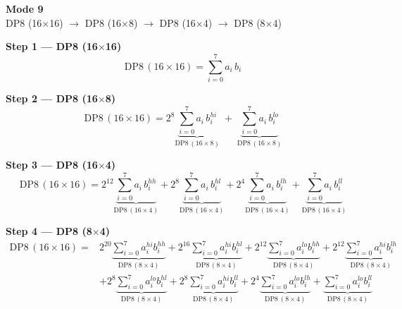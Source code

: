 \documentclass[fleqn]{article}
\newcommand{\DPop}[3]{\mathrm{DP#1}\,(#2\!\times\!#3)}
\begin{document}
\begin{center}
{\LARGE \textbf{Mode 9}}\\[4pt]
{\large DP8 (16$\times$16) $\rightarrow$ DP8 (16$\times$8) $\rightarrow$ DP8 (16$\times$4) $\rightarrow$ DP8 (8$\times$4)}
\end{center}

\vspace{4em}

\noindent\textbf{Step 1 --- DP8 (16$\times$16)}
\[
\DPop{8}{16}{16} = \sum_{i=0}^{7} a_i \, b_i
\]

\vspace{0.5em}

\noindent\textbf{Step 2 --- DP8 (16$\times$8)}
\[
\DPop{8}{16}{16}
  = 2^{8} \underbrace{\sum_{i=0}^{7} a_i \, b_i^{hi}}_{\DPop{8}{16}{8}}
  \; + \; \underbrace{\sum_{i=0}^{7} a_i \, b_i^{lo}}_{\DPop{8}{16}{8}}
\]

\vspace{0.5em}

\noindent\textbf{Step 3 --- DP8 (16$\times$4)}
\[
\DPop{8}{16}{16}
  = 2^{12} \underbrace{\sum_{i=0}^{7} a_i \, b_i^{hh}}_{\DPop{8}{16}{4}}
  + 2^{8} \underbrace{\sum_{i=0}^{7} a_i \, b_i^{hl}}_{\DPop{8}{16}{4}}
  + 2^{4} \underbrace{\sum_{i=0}^{7} a_i \, b_i^{lh}}_{\DPop{8}{16}{4}}
  + \underbrace{\sum_{i=0}^{7} a_i \, b_i^{ll}}_{\DPop{8}{16}{4}}
\]

\vspace{0.5em}

\noindent\textbf{Step 4 --- DP8 (8$\times$4)}
\begin{align*}
\DPop{8}{16}{16} = {}
  & 2^{20} \underbrace{\sum_{i=0}^{7} a_i^{hi} b_i^{hh}}_{\DPop{8}{8}{4}}
  + 2^{16} \underbrace{\sum_{i=0}^{7} a_i^{hi} b_i^{hl}}_{\DPop{8}{8}{4}}
  + 2^{12} \underbrace{\sum_{i=0}^{7} a_i^{lo} b_i^{hh}}_{\DPop{8}{8}{4}}
  + 2^{12} \underbrace{\sum_{i=0}^{7} a_i^{hi} b_i^{lh}}_{\DPop{8}{8}{4}} \\[1em]
  & + 2^{8} \underbrace{\sum_{i=0}^{7} a_i^{lo} b_i^{hl}}_{\DPop{8}{8}{4}}
  + 2^{8} \underbrace{\sum_{i=0}^{7} a_i^{hi} b_i^{ll}}_{\DPop{8}{8}{4}}
  + 2^{4} \underbrace{\sum_{i=0}^{7} a_i^{lo} b_i^{lh}}_{\DPop{8}{8}{4}}
  + \underbrace{\sum_{i=0}^{7} a_i^{lo} b_i^{ll}}_{\DPop{8}{8}{4}}
\end{align*}
\end{document}
